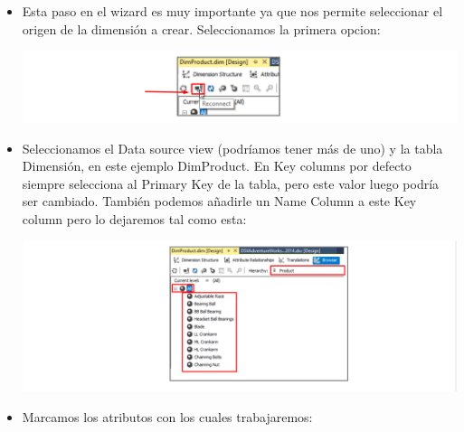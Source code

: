 \begin{itemize}
 \item Esta paso en el wizard es muy importante ya que nos permite seleccionar el origen de la dimensión a crear.
Seleccionamos la primera opcion:
	\begin{center}
	\includegraphics[width=\columnwidth]{./Imagenes/img4}
    \end{center}	

 \item Seleccionamos el Data source view (podríamos tener más de uno) y la tabla Dimensión, en este ejemplo
DimProduct. En Key columns por defecto siempre selecciona al Primary Key de la tabla, pero este valor luego
podría ser cambiado. También podemos añadirle un Name Column a este Key column pero lo dejaremos tal
como esta:
    
	\begin{center}
	\includegraphics[width=\columnwidth]{./Imagenes/img5}
    \end{center}	
 \item Marcamos los atributos con los cuales trabajaremos:
    

\end{itemize}

